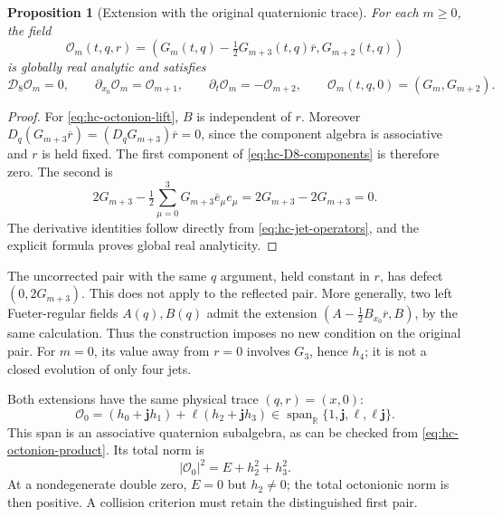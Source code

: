 \documentclass[11pt]{article}
\numberwithin{equation}{section}
\newtheorem{proposition}[theorem]{Proposition}
\theoremstyle{definition}
\theoremstyle{remark}
\newcommand{\R}{\mathbb R}
\newcommand{\jj}{\mathbf j}
\begin{document}
\begin{proposition}[Extension with the original quaternionic trace]
\label{prop:hc-octonion-extension}
For each \(m\ge0\), the field
\begin{equation}
 \mathcal O_m(t,q,r)
 =\left(G_m(t,q)-\tfrac12G_{m+3}(t,q)\overline r,
                        G_{m+2}(t,q)\right)
 \label{eq:hc-octonion-lift}
\end{equation}
is globally real analytic and satisfies
\begin{equation}
 \mathcal D_8\mathcal O_m=0,\qquad
 \partial_{x_0}\mathcal O_m=\mathcal O_{m+1},\qquad
 \partial_t\mathcal O_m=-\mathcal O_{m+2},\qquad
 \mathcal O_m(t,q,0)=(G_m,G_{m+2}).
 \label{eq:hc-octonion-identities}
\end{equation}
\end{proposition}
\begin{proof}
For \eqref{eq:hc-octonion-lift}, \(B\) is independent of \(r\).
Moreover \(D_q(G_{m+3}\overline r)=(D_qG_{m+3})\overline r=0\),
since the component algebra is associative and \(r\) is held fixed.
The first component of \eqref{eq:hc-D8-components} is therefore zero.
The second is
\[
 2G_{m+3}-\tfrac12\sum_{\mu=0}^3
                         G_{m+3}\overline e_\mu e_\mu
 =2G_{m+3}-2G_{m+3}=0.
\]
The derivative identities follow directly from
\eqref{eq:hc-jet-operators}, and the explicit formula proves global
real analyticity.
\end{proof}

The uncorrected pair with the same \(q\) argument, held constant in
\(r\), has defect \((0,2G_{m+3})\).  This does not apply to the
reflected pair.  More generally, two left
Fueter-regular fields \(A(q),B(q)\) admit the extension
\((A-\tfrac12B_{x_0}\overline r,B)\), by the same calculation.
Thus the construction imposes no new condition on the original pair.
For \(m=0\), its value away from \(r=0\) involves \(G_3\), hence
\(h_4\); it is not a closed evolution of only four jets.

Both extensions have the same physical trace \((q,r)=(x,0)\):
\[
 \mathcal O_0=(h_0+\jj h_1)+\ell(h_2+\jj h_3)
 \in\operatorname{span}_{\R}\{1,\jj,\ell,\ell\jj\}.
\]
This span is an associative quaternion subalgebra, as can be checked
from \eqref{eq:hc-octonion-product}. Its total norm is
\begin{equation}
 |\mathcal O_0|^2=E+h_2^2+h_3^2.
 \label{eq:hc-total-norm}
\end{equation}
At a nondegenerate double zero, \(E=0\) but \(h_2\ne0\); the total
octonionic norm is then positive. A collision criterion must retain
the distinguished first pair.
\end{document}
